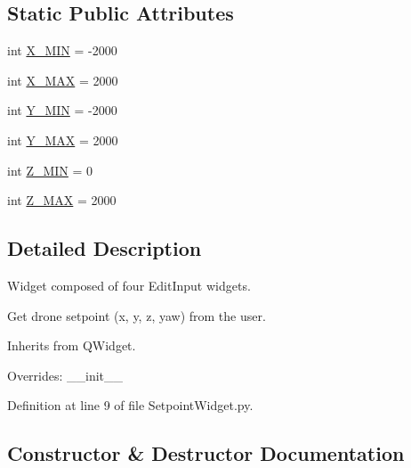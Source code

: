 \subsection*{Static Public Attributes}
\begin{DoxyCompactItemize}
\item 
int \mbox{\hyperlink{classwindshape_1_1gui_1_1widgets_1_1tabs_1_1_setpoint_widget_1_1_setpoint_widget_a331a78b7ad91c8f1b301c3bae83b6ef0}{X\+\_\+\+M\+IN}} = -\/2000
\item 
int \mbox{\hyperlink{classwindshape_1_1gui_1_1widgets_1_1tabs_1_1_setpoint_widget_1_1_setpoint_widget_ad0e4ab7b97f2e93551538058b290864e}{X\+\_\+\+M\+AX}} = 2000
\item 
int \mbox{\hyperlink{classwindshape_1_1gui_1_1widgets_1_1tabs_1_1_setpoint_widget_1_1_setpoint_widget_ac6d9b769aefaa4c05497fcaa476c6dd1}{Y\+\_\+\+M\+IN}} = -\/2000
\item 
int \mbox{\hyperlink{classwindshape_1_1gui_1_1widgets_1_1tabs_1_1_setpoint_widget_1_1_setpoint_widget_a9adfd726a7484955d89aaa86d6c760ae}{Y\+\_\+\+M\+AX}} = 2000
\item 
int \mbox{\hyperlink{classwindshape_1_1gui_1_1widgets_1_1tabs_1_1_setpoint_widget_1_1_setpoint_widget_a8096d3565eb1cc93582b494286b42fbe}{Z\+\_\+\+M\+IN}} = 0
\item 
int \mbox{\hyperlink{classwindshape_1_1gui_1_1widgets_1_1tabs_1_1_setpoint_widget_1_1_setpoint_widget_a948bfb4f773f3f664c40ee3c340b0284}{Z\+\_\+\+M\+AX}} = 2000
\end{DoxyCompactItemize}


\subsection{Detailed Description}
\begin{DoxyVerb}Widget composed of four EditInput widgets.

Get drone setpoint (x, y, z, yaw) from the user.

Inherits from QWidget.

Overrides: __init__
\end{DoxyVerb}
 

Definition at line 9 of file Setpoint\+Widget.\+py.



\subsection{Constructor \& Destructor Documentation}
\mbox{\label{classwindshape_1_1gui_1_1widgets_1_1tabs_1_1_setpoint_widget_1_1_setpoint_widget_a8c16d27f1dfd85ea38abce52e87bd980}} 
